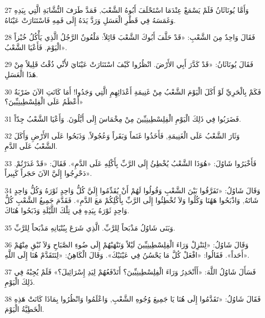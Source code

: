 \par 27 وَأَمَّا يُونَاثَانُ فَلَمْ يَسْمَعْ عِنْدَمَا اسْتَحْلَفَ أَبُوهُ الشَّعْبَ, فَمَدَّ طَرَفَ النُّشَّابَةِ الَّتِي بِيَدِهِ وَغَمَسَهُ فِي قَطْرِ الْعَسَلِ وَرَدَّ يَدَهُ إِلَى فَمِهِ فَاسْتَنَارَتْ عَيْنَاهُ.
\par 28 فَقَالَ وَاحِدٌ مِنَ الشَّعْبِ: «قَدْ حَلَّفَ أَبُوكَ الشَّعْبَ قَائِلاً: مَلْعُونٌ الرَّجُلُ الَّذِي يَأْكُلُ خُبْزاً الْيَوْمَ. فَأَعْيَا الشَّعْبُ».
\par 29 فَقَالَ يُونَاثَانُ: «قَدْ كَدَّرَ أَبِي الأَرْضَ. انْظُرُوا كَيْفَ اسْتَنَارَتْ عَيْنَايَ لأَنِّي ذُقْتُ قَلِيلاً مِنْ هَذَا الْعَسَلِ.
\par 30 فَكَمْ بِالْحَرِيِّ لَوْ أَكَلَ الْيَوْمَ الشَّعْبُ مِنْ غَنِيمَةِ أَعْدَائِهِمِ الَّتِي وَجَدُوا! أَمَا كَانَتِ الآنَ ضَرْبَةٌ أَعْظَمُ عَلَى الْفِلِسْطِينِيِّينَ؟»
\par 31 فَضَرَبُوا فِي ذَلِكَ الْيَوْمِ الْفِلِسْطِينِيِّينَ مِنْ مِخْمَاسَ إِلَى أَيَّلُونَ. وَأَعْيَا الشَّعْبُ جِدّاً.
\par 32 وَثَارَ الشَّعْبُ عَلَى الْغَنِيمَةِ, فَأَخَذُوا غَنَماً وَبَقَراً وَعُجُولاً, وَذَبَحُوا عَلَى الأَرْضِ وَأَكَلَ الشَّعْبُ عَلَى الدَّمِ.
\par 33 فَأَخْبَرُوا شَاوُلَ: «هُوَذَا الشَّعْبُ يُخْطِئُ إِلَى الرَّبِّ بِأَكْلِهِ عَلَى الدَّمِ». فَقَالَ: «قَدْ غَدَرْتُمْ. دَحْرِجُوا إِلَيَّ الآنَ حَجَراً كَبِيراً».
\par 34 وَقَالَ شَاوُلُ: «تَفَرَّقُوا بَيْنَ الشَّعْبِ وَقُولُوا لَهُمْ أَنْ يُقَدِّمُوا إِلَيَّ كُلُّ وَاحِدٍ ثَوْرَهُ وَكُلُّ وَاحِدٍ شَاتَهُ, وَاذْبَحُوا هَهُنَا وَكُلُوا وَلاَ تُخْطِئُوا إِلَى الرَّبِّ بِأَكْلِكُمْ مَعَ الدَّمِ». فَقَدَّمَ جَمِيعُ الشَّعْبِ كُلُّ وَاحِدٍ ثَوْرَهُ بِيَدِهِ فِي تِلْكَ اللَّيْلَةِ وَذَبَحُوا هُنَاكَ.
\par 35 وَبَنَى شَاوُلُ مَذْبَحاً لِلرَّبِّ. الَّذِي شَرَعَ بِبُنْيَانِهِ مَذْبَحاً لِلرَّبِّ.
\par 36 وَقَالَ شَاوُلُ: «لِنَنْزِلْ وَرَاءَ الْفِلِسْطِينِيِّينَ لَيْلاً وَنَنْهَبْهُمْ إِلَى ضُوءِ الصَّبَاحِ وَلاَ نُبْقِ مِنْهُمْ أَحَداً». فَقَالُوا: «افْعَلْ كُلَّ مَا يَحْسُنُ فِي عَيْنَيْكَ». وَقَالَ الْكَاهِنُ: «لِنَتَقَدَّمْ هُنَا إِلَى اللَّهِ».
\par 37 فَسَأَلَ شَاوُلُ اللَّهَ: «أَأَنْحَدِرُ وَرَاءَ الْفِلِسْطِينِيِّينَ؟ أَتَدْفَعُهُمْ لِيَدِ إِسْرَائِيلَ؟» فَلَمْ يُجِبْهُ فِي ذَلِكَ الْيَوْمِ.
\par 38 فَقَالَ شَاوُلُ: «تَقَدَّمُوا إِلَى هُنَا يَا جَمِيعَ وُجُوهِ الشَّعْبِ, وَاعْلَمُوا وَانْظُرُوا بِمَاذَا كَانَتْ هَذِهِ الْخَطِيَّةُ الْيَوْمَ.
